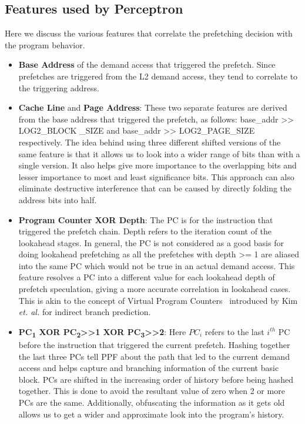 \subsection{Features used by Perceptron}
\label{Impl-Features}
Here we discuss the various features that correlate the prefetching
decision with the program behavior. 

\begin{itemize}
\item \textbf{Base Address} of the demand access that triggered the
  prefetch.  Since prefetches are triggered from the L2 demand access,
  they tend to correlate to the triggering address.

\item \textbf{Cache Line} and \textbf{Page Address}: These two
  separate features are derived from the base address that triggered
  the prefetch, as follows: base\_addr >> LOG2\_BLOCK \_SIZE and
  base\_addr >> LOG2\_PAGE\_SIZE respectively.  The idea behind using
  three different shifted versions of the same feature is that it
  allows us to look into a wider range of bits than with a single
  version.  It also helps give more importance to the overlapping bits
  and lesser importance to most and least significance bits.  This
  approach can also eliminate destructive interference that can be
  caused by directly folding the address bits into half.


\item \textbf{Program Counter XOR Depth}: The PC is for the
  instruction that triggered the prefetch chain.  Depth refers to the
  iteration count of the lookahead stages.  In general, the PC is not
  considered as a good basis for doing lookahead prefetching as all
  the prefetches with depth >= 1 are aliased into the same PC which
  would not be true in an actual demand access.  This feature resolves
  a PC into a different value for each lookahead depth of prefetch
  speculation, giving a more accurate correlation in lookahead cases.
  This is akin to the concept of Virtual Program Counters~\cite{VPC}
  introduced by Kim \textit{et. al.} for indirect branch prediction.

\item \textbf{PC\textsubscript{1} XOR PC\textsubscript{2}>>1 XOR
    PC\textsubscript{3}>>2}: Here $PC_i$ refers to the last $i^{th}$
  PC before the instruction that triggered the current prefetch.
  Hashing together the last three PCs tell PPF about the path that led
  to the current demand access and helps capture and branching
  information of the current basic block.  PCs are shifted in the
  increasing order of history before being hashed together.  This is
  done to avoid the resultant value of zero when 2 or more PCs are the
  same.  Additionally, obfuscating the information as it gets old
  allows us to get a wider and approximate look into the program's
  history.


\end{itemize}
